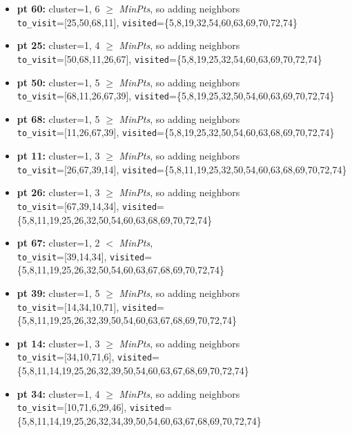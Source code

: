 \documentclass[11pt]{article}
\begin{document}
\begin{itemize}[label=$\star$]
\begin{itemize}[label=$\cdot$]
				\item \textbf{pt 60:} cluster=1, 6 $\ge$ \textit{MinPts}, so adding neighbors \\ \texttt{to\_visit}=[25,50,68,11], \texttt{visited}=\{5,8,19,32,54,60,63,69,70,72,74\}
				\item \textbf{pt 25:} cluster=1, 4 $\ge$ \textit{MinPts}, so adding neighbors \\ \texttt{to\_visit}=[50,68,11,26,67], \texttt{visited}=\{5,8,19,25,32,54,60,63,69,70,72,74\}
				\item \textbf{pt 50:} cluster=1, 5 $\ge$ \textit{MinPts}, so adding neighbors \\ \texttt{to\_visit}=[68,11,26,67,39], \texttt{visited}=\{5,8,19,25,32,50,54,60,63,69,70,72,74\}
				\item \textbf{pt 68:} cluster=1, 5 $\ge$ \textit{MinPts}, so adding neighbors \\ \texttt{to\_visit}=[11,26,67,39], \texttt{visited}=\{5,8,19,25,32,50,54,60,63,68,69,70,72,74\}
				\item \textbf{pt 11:} cluster=1, 3 $\ge$ \textit{MinPts}, so adding neighbors \\ \texttt{to\_visit}=[26,67,39,14], \texttt{visited}=\{5,8,11,19,25,32,50,54,60,63,68,69,70,72,74\}
				\item \textbf{pt 26:} cluster=1, 3 $\ge$ \textit{MinPts}, so adding neighbors \\ \texttt{to\_visit}=[67,39,14,34], \texttt{visited}=\{5,8,11,19,25,26,32,50,54,60,63,68,69,70,72,74\}
				\item \textbf{pt 67:} cluster=1, 2 $<$ \textit{MinPts}, \\ \texttt{to\_visit}=[39,14,34], \texttt{visited}=\{5,8,11,19,25,26,32,50,54,60,63,67,68,69,70,72,74\}
				\item \textbf{pt 39:} cluster=1, 5 $\ge$ \textit{MinPts}, so adding neighbors \\ \texttt{to\_visit}=[14,34,10,71], \texttt{visited}=\{5,8,11,19,25,26,32,39,50,54,60,63,67,68,69,70,72,74\}
				\item \textbf{pt 14:} cluster=1, 3 $\ge$ \textit{MinPts}, so adding neighbors \\ \texttt{to\_visit}=[34,10,71,6], \texttt{visited}=\{5,8,11,14,19,25,26,32,39,50,54,60,63,67,68,69,70,72,74\}
				\item \textbf{pt 34:} cluster=1, 4 $\ge$ \textit{MinPts}, so adding neighbors \\ \texttt{to\_visit}=[10,71,6,29,46], \texttt{visited}=\{5,8,11,14,19,25,26,32,34,39,50,54,60,63,67,68,69,70,72,74\}

\end{itemize}
\end{itemize}
\end{document}
